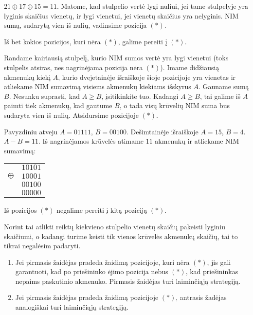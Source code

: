 $21 \oplus 17 \oplus 15=11$. Matome, kad stulpelio vertė lygi nuliui, jei
tame stulpelyje yra lyginis skaičius vienetų, ir lygi vienetui, jei vienetų
skaičius yra nelyginis. NIM sumą, sudarytą vien iš nulių, vadinsime pozicija
$(*)$. 

\begin{teig}
  Iš bet kokios pozicijos, kuri nėra $(*)$, galime pereiti į  $(*)$.
\end{teig}

Randame kairiausią stulpelį, kurio NIM sumos vertė yra lygi vienetui (toks
stulpelis atsiras, nes nagrinėjama pozicija nėra $(*)$). Imame didžiausią
akmenukų kiekį $A$, kurio dvejetainėje išraiškoje šioje pozicijoje yra
vienetas ir atliekame NIM sumavimą visiems akmenukų kiekiams išskyrus $A$.
Gauname sumą $B$.  Nesunku suprasti, kad $A\geq B$, įsitikinkite tuo. Kadangi
$A\geq B$, tai galime iš $A$ paimti tiek akmenukų, kad gautume $B$, o tada visų
krūvelių NIM suma bus sudaryta vien iš nulių. Atsidursime pozicijoje $(*)$.

Pavyzdiniu atveju $A = 01111$, $B = 00100$. Dešimtainėje išraiškoje $A =
15$, $B = 4$. $A - B = 11$. Iš nagrinėjamos krūvelės atimame $11$ akmenukų ir
atliekame NIM sumavimą: 

\begin{center}
  \begin{tabular}[c]{r c}
    & $10101$ \\
    $\oplus$ & $10001$ \\
    & $00100$ \\ \hline
    & $00000$
  \end{tabular}
\end{center}

\begin{teig}
  Iš pozicijos $(*)$ negalime pereiti į kitą poziciją $(*)$.
\end{teig}

Norint tai atlikti reiktų kiekvieno stulpelio vienetų skaičių pakeisti
lyginiu skaičiumi, o kadangi turime keisti tik vienos krūvelės akmenukų
skaičių, tai to tikrai negalėsim padaryti.

\begin{enumerate}
  \item Jei pirmasis žaidėjas pradeda žaidimą pozicijoje, kuri nėra $(*)$,
    jis gali garantuoti, kad po priešininko ėjimo pozicija nebus $(*)$, kad
    priešininkas nepaims paskutinio akmenuko. Pirmasis žaidėjas turi
    laiminčiąją strategiją.
  \item Jei pirmasis žaidėjas pradeda žaidimą pozicijoje $(*)$, antrasis
    žadėjas analogiškai turi laiminčiąją strategiją. 
\end{enumerate}


